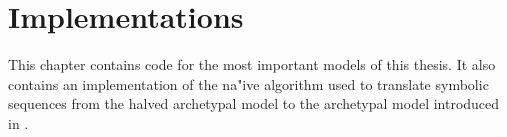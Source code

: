 \chapter{Implementations}
\label{chap:app.implementations}

\lstset{
	numbers=left,
	stepnumber=1,
	numberstyle=\tiny,
	numbersep=2em,
	numberblanklines=false,
}

This chapter contains code for the most important models of this thesis.
It also contains an implementation of the na"ive algorithm used to translate symbolic sequences from the halved archetypal model to the archetypal model introduced in .



